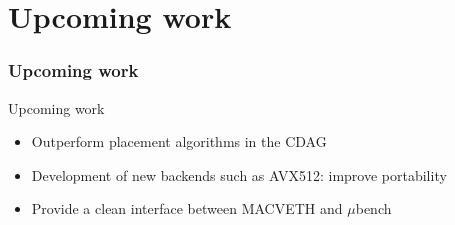 \documentclass[xcolor=table,hideothersubsections,aspectratio=1610]{beamer}
\begin{document}


\section{Upcoming work}
\frametitle{Upcoming work}
\begin{frame}{Upcoming work}
\begin{itemize}
    \item Outperform placement algorithms in the CDAG
    \item Development of new backends such as AVX512: improve portability
    \item Provide a clean interface between MACVETH and $\mu$bench
\end{itemize}
\end{frame}

\begin{frame}[plain,t]
\titlepage
\end{frame}
\end{document}
